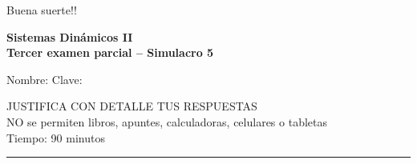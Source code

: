 \documentclass[11pt]{article}
\begin{document}
\vspace{0.5cm}
\begin{center}
\Large Buena suerte!!
\end{center}

\newpage
\textbf{Sistemas Dinámicos II}\\
\textbf{Tercer examen parcial -- Simulacro 5}

\vspace{0.6cm}
Nombre: \underline{\hspace{9cm}} \quad Clave: \underline{\hspace{3cm}}

\vspace{0.5cm}
\begin{center}
JUSTIFICA CON DETALLE TUS RESPUESTAS\\
NO se permiten libros, apuntes, calculadoras, celulares o tabletas\\
Tiempo: 90 minutos
\end{center}
\vspace{-0.2cm}
\rule{\textwidth}{0.4pt}
\vspace{0.2cm}
\end{document}
